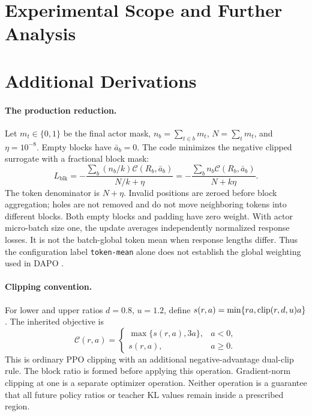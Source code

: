 \section{Experimental Scope and Further Analysis}
\label{sec:limits}


\section{Additional Derivations}
\label{app:proofs}
\paragraph{The production reduction.}
Let $m_t\in\{0,1\}$ be the final actor mask, $n_b=\sum_{t\in b}m_t$, $N=\sum_t m_t$, and $\eta=10^{-8}$. Empty blocks have $\bar a_b=0$.
The code minimizes the negative clipped surrogate with a fractional block mask:
\begin{equation}
 L_{\mathrm{blk}}=-\frac{\sum_b(n_b/k)\mathcal C(R_b,\bar a_b)}{N/k+\eta}
 =-\frac{\sum_b n_b\mathcal C(R_b,\bar a_b)}{N+k\eta}.
\end{equation}
The token denominator is $N+\eta$. Invalid positions are zeroed before block aggregation; holes are not removed and do not move neighboring tokens into different blocks. Both empty blocks and padding have zero weight. With actor micro-batch size one, the update averages independently normalized response losses. It is not the batch-global token mean when response lengths differ. Thus the configuration label \texttt{token-mean} alone does not establish the global weighting used in DAPO \citep{dapo}.

\paragraph{Clipping convention.}
For lower and upper ratios $d=0.8$, $u=1.2$, define $s(r,a)=\min\{ra,\operatorname{clip}(r,d,u)a\}$. The inherited objective is
\begin{equation}
 \mathcal C(r,a)=\begin{cases}\max\{s(r,a),3a\},&a<0,\\s(r,a),&a\ge0.\end{cases}
\end{equation}
This is ordinary PPO clipping with an additional negative-advantage dual-clip rule. The block ratio is formed before applying this operation. Gradient-norm clipping at one is a separate optimizer operation. Neither operation is a guarantee that all future policy ratios or teacher KL values remain inside a prescribed region.

